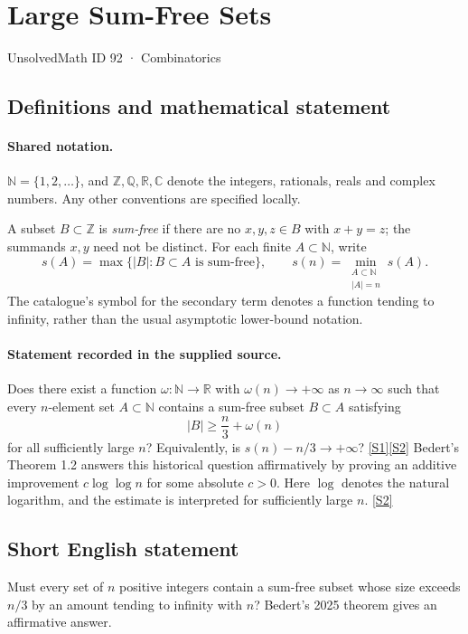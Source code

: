 \documentclass[11pt]{article}
\newcommand{\sref}[2]{\hyperlink{source:#1:#2}{[S#2]}}
\begin{document}
\setcounter{section}{91}
\section{Large Sum-Free Sets}\label{92}
{\small\sffamily UnsolvedMath ID 92 · Combinatorics}
\subsection{Definitions and mathematical statement}

\paragraph{Shared notation.}$\mathbb N=\{1,2,\ldots\}$, and $\mathbb Z,\mathbb Q,\mathbb R,\mathbb C$ denote the integers, rationals, reals and complex numbers. Any other conventions are specified locally.


A subset $B\subset\mathbb Z$ is \emph{sum-free} if there are no $x,y,z\in B$ with $x+y=z$; the summands $x,y$ need not be distinct. For each finite $A\subset\mathbb N$, write
\[
s(A)=\max\{|B|:B\subset A\text{ is sum-free}\},\qquad
s(n)=\min_{\substack{A\subset\mathbb N\\|A|=n}}s(A).
\]
The catalogue's symbol for the secondary term denotes a function tending to infinity, rather than the usual asymptotic lower-bound notation.
\paragraph{Statement recorded in the supplied source.}
Does there exist a function $\omega:\mathbb N\to\mathbb R$ with $\omega(n)\to+\infty$ as $n\to\infty$ such that every $n$-element set $A\subset\mathbb N$ contains a sum-free subset $B\subset A$ satisfying
\[
|B|\ge \frac n3+\omega(n)
\]
for all sufficiently large $n$? Equivalently, is $s(n)-n/3\to+\infty$? \sref{92}{1}\sref{92}{2}
Bedert's Theorem 1.2 answers this historical question affirmatively by proving an additive improvement $c\log\log n$ for some absolute $c>0$. Here $\log$ denotes the natural logarithm, and the estimate is interpreted for sufficiently large $n$. \sref{92}{2}
\subsection{Short English statement}
Must every set of $n$ positive integers contain a sum-free subset whose size exceeds $n/3$ by an amount tending to infinity with $n$? Bedert's 2025 theorem gives an affirmative answer.
\end{document}
